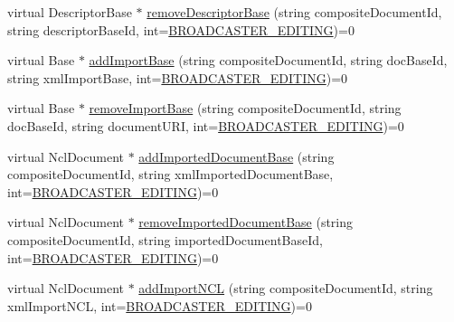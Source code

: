 \begin{DoxyCompactItemize}
\item 
virtual DescriptorBase $\ast$ \hyperlink{classbr_1_1ufscar_1_1lince_1_1ginga_1_1wac_1_1editing_1_1IFormatterAdapter_a1f4faecc413a705202b50da30cb2c17b}{removeDescriptorBase} (string compositeDocumentId, string descriptorBaseId, int=\hyperlink{classbr_1_1ufscar_1_1lince_1_1ginga_1_1wac_1_1editing_1_1IFormatterAdapter_a60586f9a11e5cefcfecef9386c28d4bd}{BROADCASTER\_\-EDITING})=0
\item 
virtual Base $\ast$ \hyperlink{classbr_1_1ufscar_1_1lince_1_1ginga_1_1wac_1_1editing_1_1IFormatterAdapter_ad9633e31a4cf3ec03f2e98cbad6567e3}{addImportBase} (string compositeDocumentId, string docBaseId, string xmlImportBase, int=\hyperlink{classbr_1_1ufscar_1_1lince_1_1ginga_1_1wac_1_1editing_1_1IFormatterAdapter_a60586f9a11e5cefcfecef9386c28d4bd}{BROADCASTER\_\-EDITING})=0
\item 
virtual Base $\ast$ \hyperlink{classbr_1_1ufscar_1_1lince_1_1ginga_1_1wac_1_1editing_1_1IFormatterAdapter_a5c6797efc83b486a3dee998fce3d9c88}{removeImportBase} (string compositeDocumentId, string docBaseId, string documentURI, int=\hyperlink{classbr_1_1ufscar_1_1lince_1_1ginga_1_1wac_1_1editing_1_1IFormatterAdapter_a60586f9a11e5cefcfecef9386c28d4bd}{BROADCASTER\_\-EDITING})=0
\item 
virtual NclDocument $\ast$ \hyperlink{classbr_1_1ufscar_1_1lince_1_1ginga_1_1wac_1_1editing_1_1IFormatterAdapter_a0fe84bf645231f3b73a05ccb32ebf7a5}{addImportedDocumentBase} (string compositeDocumentId, string xmlImportedDocumentBase, int=\hyperlink{classbr_1_1ufscar_1_1lince_1_1ginga_1_1wac_1_1editing_1_1IFormatterAdapter_a60586f9a11e5cefcfecef9386c28d4bd}{BROADCASTER\_\-EDITING})=0
\item 
virtual NclDocument $\ast$ \hyperlink{classbr_1_1ufscar_1_1lince_1_1ginga_1_1wac_1_1editing_1_1IFormatterAdapter_ad001bfa641609f9fc6e4b30396229c9f}{removeImportedDocumentBase} (string compositeDocumentId, string importedDocumentBaseId, int=\hyperlink{classbr_1_1ufscar_1_1lince_1_1ginga_1_1wac_1_1editing_1_1IFormatterAdapter_a60586f9a11e5cefcfecef9386c28d4bd}{BROADCASTER\_\-EDITING})=0
\item 
virtual NclDocument $\ast$ \hyperlink{classbr_1_1ufscar_1_1lince_1_1ginga_1_1wac_1_1editing_1_1IFormatterAdapter_aa41fa59a974389ee0f4ada5194210140}{addImportNCL} (string compositeDocumentId, string xmlImportNCL, int=\hyperlink{classbr_1_1ufscar_1_1lince_1_1ginga_1_1wac_1_1editing_1_1IFormatterAdapter_a60586f9a11e5cefcfecef9386c28d4bd}{BROADCASTER\_\-EDITING})=0
\item 

\end{DoxyCompactItemize}
